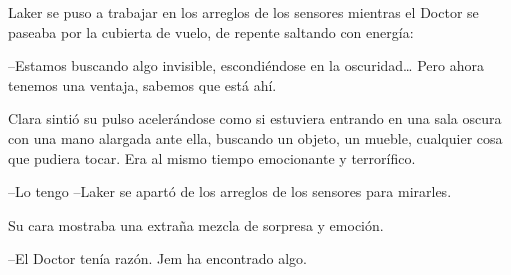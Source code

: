 {Laker se puso a trabajar en los arreglos de los sensores mientras el
 Doctor se paseaba por la cubierta de vuelo, de repente saltando con
energía:}

{--Estamos buscando algo invisible, escondiéndose en la oscuridad\ldots{}
Pero ahora tenemos una ventaja, sabemos que está ahí.}

{Clara sintió su pulso acelerándose como si estuviera entrando en una
 sala oscura con una mano alargada ante ella, buscando un objeto, un
 mueble, cualquier cosa que pudiera tocar. Era al mismo tiempo
emocionante y terrorífico.}

{--Lo tengo --Laker se apartó de los arreglos de los sensores para
mirarles.}

{Su cara mostraba una extraña mezcla de sorpresa y emoción.}

{--El Doctor tenía razón. Jem ha encontrado algo.}
